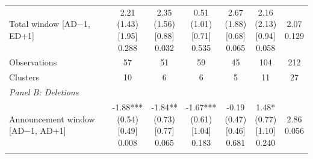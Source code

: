 \begin{threeparttable}
\begin{tabular}{@{}lcccccc}
Total window [AD$-$1, ED+1] & \makecell{2.21\\(1.43)\\{}[1.95]\\{0.288}} & \makecell{2.35\\(1.56)\\{}[0.88]\\{0.032}} & \makecell{0.51\\(1.01)\\{}[0.71]\\{0.535}} & \makecell{2.67\\(1.88)\\{}[0.68]\\{0.065}} & \makecell{2.16\\(2.13)\\{}[0.94]\\{0.058}} & \makecell{2.07\\{0.129}} \\
\addlinespace[0.25ex]
\addlinespace[0.25ex]
Observations & 57 & 51 & 59 & 45 & 104 & 212 \\
\addlinespace[0.25ex]
\addlinespace[0.25ex]
Clusters & 10 & 6 & 6 & 5 & 11 & 27 \\
\addlinespace[0.25ex]
\midrule
\emph{Panel B: Deletions} \\
\addlinespace[0.25ex]
\addlinespace[1ex]
Announcement window [AD$-$1, AD+1] & \makecell{-1.88***\\(0.54)\\{}[0.49]\\{0.008}} & \makecell{-1.84**\\(0.73)\\{}[0.77]\\{0.065}} & \makecell{-1.67***\\(0.61)\\{}[1.04]\\{0.183}} & \makecell{-0.19\\(0.47)\\{}[0.46]\\{0.681}} & \makecell{1.48*\\(0.77)\\{}[1.10]\\{0.240}} & \makecell{2.86\\{0.056}} \\
\addlinespace[0.25ex]
\addlinespace[0.25ex]

\end{tabular}
\end{threeparttable}
